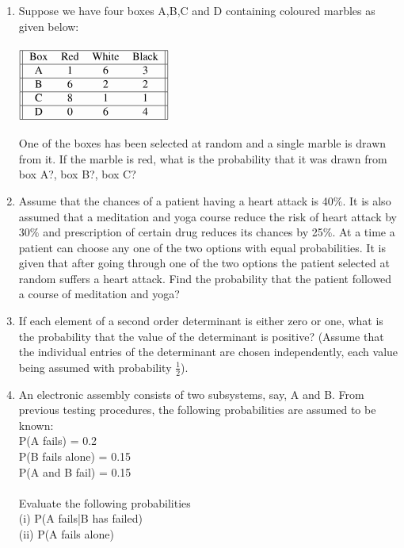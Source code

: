 \begin{enumerate}[label=\arabic*.,ref=\thesubsection.\theenumi]
\item Suppose we have four boxes A,B,C and D containing coloured marbles as given below:\\
\\$\begin{tabular}{||c c c c||} 
 \hline
 Box & Red & White & Black \\
 \hline
 A & 1 & 6 & 3 \\
 \hline
 B & 6 & 2 & 2 \\
 \hline
 C & 8 & 1 & 1 \\
 \hline
 D & 0 & 6 & 4 \\
 \hline
\end{tabular}$\\
\\One of the boxes has been selected at random and a single marble is drawn from
it. If the marble is red, what is the probability that it was drawn from box A?, box B?,
box C?\\

\item Assume that the chances of a patient having a heart attack is 40$\%$. It is also
assumed that a meditation and yoga course reduce the risk of heart attack by 30$\%$ and prescription of certain drug reduces its chances by 25$\%$. At a time a patient can choose any one of the two options with equal probabilities. It is given that after going through one of the two options the patient selected at random suffers a heart attack. Find the probability that the patient followed a course of meditation and yoga?\\

\item If each element of a second order determinant is either zero or one, what is the
probability that the value of the determinant is positive? (Assume that the individual entries of the determinant are chosen independently, each value being
assumed with probability $\frac{1}{2}$).\\

\item An electronic assembly consists of two subsystems, say, A and B. From previous testing procedures, the following probabilities are assumed to be known:\\
P(A fails) = 0.2\\
P(B fails alone) = 0.15\\
P(A and B fail) = 0.15\\
\\Evaluate the following probabilities\\
(i) P(A fails|B has failed) \\
(ii) P(A fails alone)\\


\end{enumerate}
